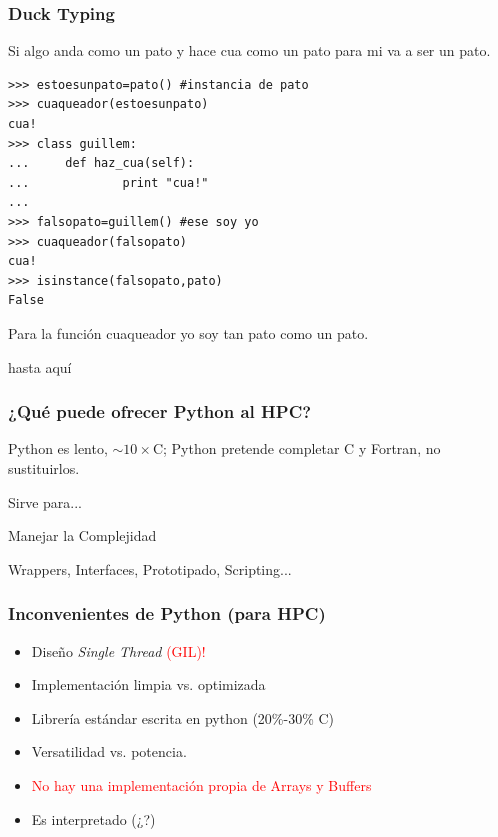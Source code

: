 \documentclass{beamer}
\begin{document}
\begin{frame}[containsverbatim]
 \frametitle{Duck Typing}
Si algo anda como un pato y hace cua como un pato para mi va a ser un pato.
\begin{verbatim}
>>> estoesunpato=pato() #instancia de pato
>>> cuaqueador(estoesunpato)
cua!
>>> class guillem:
...     def haz_cua(self):
...             print "cua!"
...
>>> falsopato=guillem() #ese soy yo
>>> cuaqueador(falsopato)
cua!
>>> isinstance(falsopato,pato)
False
\end{verbatim}
Para la función cuaqueador yo soy tan pato como un pato.
\end{frame}

\begin{frame}
 \begin{center}
 \begin{Huge}
  hasta aquí
 \end{Huge}
\end{center}
\end{frame}


\begin{frame}
 \frametitle{¿Qué puede ofrecer Python al HPC?}
Python es lento, $\sim 10 \times$C; Python pretende completar C y Fortran, no sustituirlos.
\vspace{1cm}
\begin{center}
Sirve para...\\
\vspace{1cm}
 \begin{Huge}
  Manejar la Complejidad
 \end{Huge} 
\end{center}
Wrappers, Interfaces, Prototipado, Scripting...
\end{frame}

\begin{frame}
 \frametitle{Inconvenientes de Python (para HPC)}
\begin{itemize}
 \item Diseño \emph{Single Thread} \textcolor{red}{(GIL)!}
 \item Implementación limpia vs. optimizada
 \item Librería estándar escrita en python (20\%-30\%  C)
 \item Versatilidad vs. potencia.
 \item \textcolor{red}{No hay una implementación propia de Arrays y Buffers}
 \item Es interpretado (¿?)
\end{itemize}
\end{frame}
\end{document}
